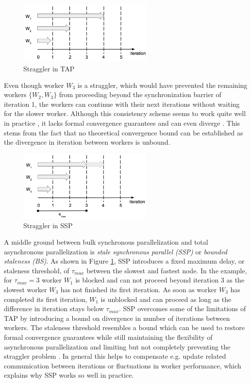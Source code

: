 \begin{figure}[ht]
\centering
\includegraphics[width=0.6\textwidth]{img/tap_straggler.png}
\caption{Straggler in TAP}
\label{fig:tap_straggler}
\end{figure}
Even though worker $W_3$ is a straggler, which would have prevented the remaining workers $\{W_2, W_3\}$ from proceeding beyond the synchronization barrier of iteration 1, the workers can continue with their next iterations without waiting for the slower worker.
Although this consistency scheme seems to work quite well in practice \cite{Li2014}, it lacks formal convergence guarantees and can even diverge \cite{dai2014high}.
This stems from the fact that no theoretical convergence bound can be established as the divergence in iteration between workers is unbound.
\begin{figure}[ht]
\centering
\includegraphics[width=0.6\textwidth]{img/ssp_straggler.png}
\caption{Straggler in SSP}
\label{fig:ssp_straggler}
\end{figure}
A middle ground between bulk synchronous parallelization and total asynchronous parallelization is \textit{stale synchronous parallel (SSP)} \cite{ho2013more} or \textit{bounded staleness (BS)}.
As shown in Figure \ref{fig:tap_straggler}, SSP introduces a fixed maximum delay, or staleness threshold, of $\tau_{max}$ between the slowest and fastest node.
In the example, for $\tau_{max} = 3$ worker $W_1$ is blocked and can not proceed beyond iteration 3 as the slowest worker $W_3$ has not finished its first iteration.
As soon as worker $W_3$ has completed its first iteration, $W_1$ is unblocked and can proceed as long as the difference in iteration stays below $\tau_{max}$.
SSP overcomes some of the limitations of TAP by introducing a bound on divergence in number of iterations between workers.
The staleness threshold resembles a bound which can be used to restore formal convergence guarantees while still maintaining the flexibility of asynchronous parallelization and limiting but not completely preventing the straggler problem \cite{cipar2013solving}.
In general this helps to compensate e.g. update related communication between iterations or fluctuations in worker performance, which explains why SSP works so well in practice.
